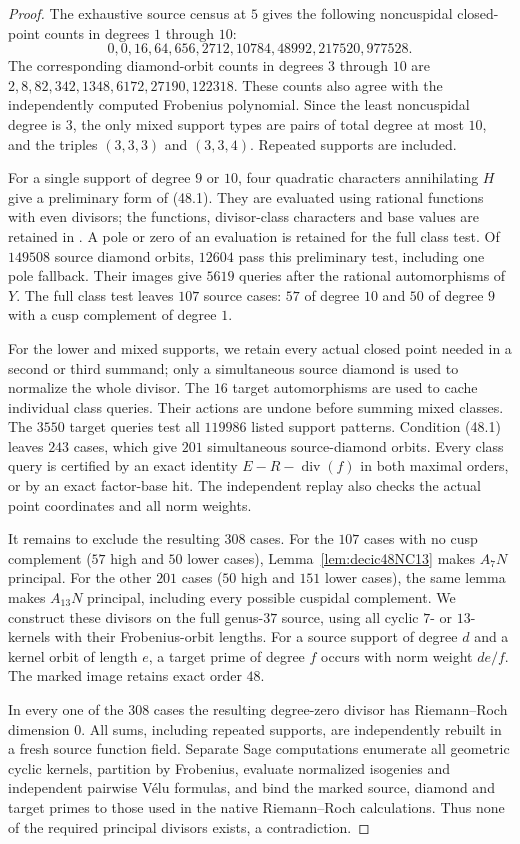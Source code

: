 \begin{proof}
The exhaustive source census at $5$ gives the following noncuspidal
closed-point counts in degrees $1$ through $10$:
\[
 0,0,16,64,656,2712,10784,48992,217520,977528.
\]
The corresponding diamond-orbit counts in degrees $3$ through $10$
are $2,8,82,342,1348,6172,27190,122318$.
These counts also agree with the independently computed Frobenius
polynomial. Since the least noncuspidal degree is $3$, the only mixed
support types are pairs of total degree at most $10$, and the triples
$(3,3,3)$ and $(3,3,4)$. Repeated supports are included.

For a single support of degree $9$ or $10$, four quadratic characters
annihilating $H$ give a preliminary form of (48.1). They are evaluated
using rational functions with even divisors; the functions, divisor-class
characters and base values are retained in
. A pole or zero of an evaluation is
retained for the full class test. Of $149508$ source diamond orbits,
$12604$ pass this preliminary test, including one pole fallback.
Their images give $5619$ queries after the rational automorphisms of $Y$.
The full class test leaves $107$ source cases: $57$ of degree $10$ and
$50$ of degree $9$ with a cusp complement of degree $1$.

For the lower and mixed supports, we retain every actual closed point
needed in a second or third summand; only a simultaneous source diamond
is used to normalize the whole divisor. The $16$ target automorphisms
are used to cache individual class queries. Their actions are undone
before summing mixed classes. The $3550$ target queries test all
$119986$ listed support patterns. Condition (48.1) leaves $243$ cases,
which give $201$ simultaneous source-diamond orbits.
Every class query is certified by an exact identity
$E-R-\operatorname{div}(f)$ in both maximal orders, or by an exact
factor-base hit. The independent replay also checks the actual point
coordinates and all norm weights.

It remains to exclude the resulting $308$ cases. For the $107$ cases
with no cusp complement ($57$ high and $50$ lower cases), Lemma~\ref{lem:decic48NC13} makes
$A_7N$ principal. For the other $201$ cases ($50$ high and $151$ lower cases), the same lemma makes
$A_{13}N$ principal, including every possible cuspidal complement.
We construct these divisors on the full genus-$37$ source, using all
cyclic $7$- or $13$-kernels with their Frobenius-orbit lengths.
For a source support of degree $d$ and a kernel orbit of length $e$,
a target prime of degree $f$ occurs with norm weight $de/f$.
The marked image retains exact order $48$.

In every one of the $308$ cases the resulting degree-zero divisor
has Riemann--Roch dimension $0$. All sums, including repeated supports,
are independently rebuilt in a fresh source function field. Separate
Sage computations enumerate all geometric cyclic kernels, partition
by Frobenius, evaluate normalized isogenies and independent pairwise
V\'elu formulas, and bind the marked source, diamond and target primes
to those used in the native Riemann--Roch calculations.
Thus none of the required principal divisors exists, a contradiction.
\end{proof}
